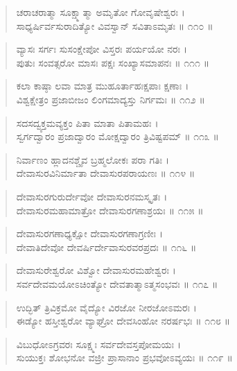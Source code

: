 \begin{verse}
ಚರಾಚರಾತ್ಮಾ ಸೂಕ್ಷ್ಮಾತ್ಮಾ ಅಮೃತೋ ಗೋವೃಷೇಶ್ವರಃ ।\\ಸಾಧ್ಯರ್ಷಿರ್ವಸುರಾದಿತ್ಯೋ ವಿವಸ್ವಾನ್ ಸವಿತಾಽಮೃತಃ \num{॥ ೧೧೦ ॥}
\end{verse}

\begin{verse}
ವ್ಯಾಸಃ ಸರ್ಗಃ ಸುಸಂಕ್ಷೇಪೋ ವಿಸ್ತರಃ ಪರ್ಯಯೋ ನರಃ ।\\ಪುತುಃ ಸಂವತ್ಸರೋ ಮಾಸಃ ಪಕ್ಷಃ ಸಂಖ್ಯಾಸಮಾಪನಃ \num{॥ ೧೧೧ ॥}
\end{verse}

\begin{verse}
ಕಲಾ ಕಾಷ್ಠಾ ಲವಾ ಮಾತ್ರ ಮುಹೂರ್ತಾಹಃಕ್ಷಪಾಃ ಕ್ಷಣಾಃ ।\\ವಿಶ್ವಕ್ಷೇತ್ರಂ ಪ್ರಜಾಬೀಜಂ ಲಿಂಗಮಾದ್ಯಸ್ತು ನಿರ್ಗಮಃ \num{॥ ೧೧೨ ॥}
\end{verse}

\begin{verse}
ಸದಸದ್ವ್ಯಕ್ತಮವ್ಯಕ್ತಂ ಪಿತಾ ಮಾತಾ ಪಿತಾಮಹಃ ।\\ಸ್ವರ್ಗದ್ವಾರಂ ಪ್ರಜಾದ್ವಾರಂ ಮೋಕ್ಷದ್ವಾರಂ ತ್ರಿವಿಷ್ಟಪಮ್ \num{॥ ೧೧೩ ॥}
\end{verse}

\begin{verse}
ನಿರ್ವಾಣಂ ಹ್ಲಾದನಶ್ಚೈವ ಬ್ರಹ್ಮಲೋಕಃ ಪರಾ ಗತಿಃ ।\\ದೇವಾಸುರವಿನಿರ್ಮಾತಾ ದೇವಾಸುರಪರಾಯಣಃ \num{॥ ೧೧೪ ॥}
\end{verse}

\begin{verse}
ದೇವಾಸುರಗುರುರ್ದೇವೋ ದೇವಾಸುರನಮಸ್ಕೃತಃ ।\\ದೇವಾಸುರಮಹಾಮಾತ್ರೋ ದೇವಾಸುರಗಣಾಶ್ರಯಃ \num{॥ ೧೧೫ ॥}
\end{verse}

\begin{verse}
ದೇವಾಸುರಗಣಾಧ್ಯಕ್ಷೋ ದೇವಾಸುರಗಣಾಗ್ರಣೀಃ ।\\ದೇವಾತಿದೇವೋ ದೇವರ್ಷಿರ್ದೇವಾಸುರವರಪ್ರದಃ \num{॥ ೧೧೬ ॥}
\end{verse}

\begin{verse}
ದೇವಾಸುರೇಶ್ವರೋ ವಿಶ್ವೋ ದೇವಾಸುರಮಹೇಶ್ವರಃ ।\\ಸರ್ವದೇವಮಯೋಽಚಿಂತ್ಯೋ ದೇವತಾತ್ಮಾಽತ್ಮಸಂಭವಃ \num{॥ ೧೧೭ ॥}
\end{verse}

\begin{verse}
ಉದ್ಭಿತ್ ತ್ರಿವಿಕ್ರಮೋ ವೈದ್ಯೋ ವಿರಜೋ ನೀರಜೋಽಮರಃ ।\\ಈಡ್ಯೋ ಹಸ್ತೀಶ್ವರೋ ವ್ಯಾಘ್ರೋ ದೇವಸಿಂಹೋ ನರರ್ಷಭಃ \num{॥ ೧೧೮ ॥}
\end{verse}

\begin{verse}
ವಿಬುಧೋಽಗ್ರವರಃ ಸೂಕ್ಷ್ಮಃ ಸರ್ವದೇವಸ್ತಪೋಮಯಃ ।\\ಸುಯುಕ್ತಃ ಶೋಭನೋ ವಜ್ರೀ ಪ್ರಾಸಾನಾಂ ಪ್ರಭವೋಽವ್ಯಯಃ \num{॥ ೧೧೯ ॥}
\end{verse}

